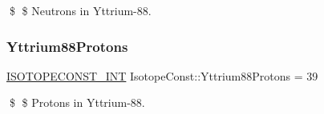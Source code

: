 \$ \$ Neutrons in Yttrium-\/88. \mbox{\label{group___isotope_const-_yttrium-_y88_ga4c0a31702c35bfc2cc1c0651fc048d98}} 
\subsubsection{\texorpdfstring{Yttrium88\+Protons}{Yttrium88Protons}}
{\footnotesize\ttfamily \mbox{\hyperlink{group___isotope_const-_macros_ga5f18360b3e99483a35c32d789e62621c}{I\+S\+O\+T\+O\+P\+E\+C\+O\+N\+S\+T\+\_\+\+I\+NT}} Isotope\+Const\+::\+Yttrium88\+Protons = 39}

\$ \$ Protons in Yttrium-\/88. 